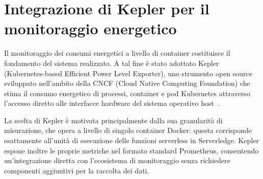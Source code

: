 \section{Integrazione di Kepler per il monitoraggio energetico}

Il monitoraggio dei consumi energetici a livello di container costituisce 
il fondamento del sistema realizzato. A tal fine è stato adottato Kepler 
(Kubernetes-based Efficient Power Level Exporter), uno strumento open 
source sviluppato nell'ambito della CNCF (Cloud Native Computing 
Foundation) che stima il consumo energetico di processi, container e 
pod Kubernetes attraverso l'accesso diretto alle interfacce hardware del 
sistema operativo host~\cite{keplerCNCF2023}.

La scelta di Kepler è motivata principalmente dalla sua granularità di 
misurazione, che opera a livello di singolo container Docker: questa 
corrisponde esattamente all'unità di esecuzione delle funzioni serverless 
in Serverledge. Kepler espone inoltre le proprie metriche nel formato 
standard Prometheus, consentendo un'integrazione diretta con l'ecosistema 
di monitoraggio senza richiedere componenti aggiuntivi per la raccolta 
dei dati.


